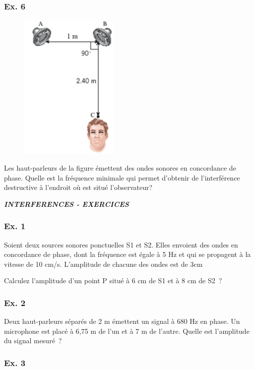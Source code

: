 {\subsubsection{Ex. 6}

\begin{figure}
\centering
\includegraphics[width=4.757cm,height=7.147cm]{Pictures/10000001000001BA00000298E2F6E319C348E061.png}
\caption{}
\end{figure}

Les haut-parleurs de la figure émettent des ondes sonores en concordance
de phase. Quelle est la fréquence minimale qui permet d'obtenir de
l'interférence destructive à l'endroit où est situé l'observateur?

\emph{\textbf{INTERFERENCES - EXERCICES}}

\subsubsection{Ex. 1}

Soient deux sources sonores ponctuelles S1 et S2. Elles envoient des
ondes en concordance de phase, dont la fréquence est égale à 5 Hz et qui
se propagent à la vitesse de 10 cm/s. L'amplitude de chacune des ondes
est de 3cm

Calculez l'amplitude d'un point P situé à 6 cm de S1 et à 8 cm de S2~?

\subsubsection{Ex. 2}

Deux haut-parleurs séparés de 2 m émettent un signal à 680 Hz en phase.
Un microphone est placé à 6,75 m de l'un et à 7 m de l'autre. Quelle est
l'amplitude du signal mesuré~?

\subsubsection{Ex. 3}

}
